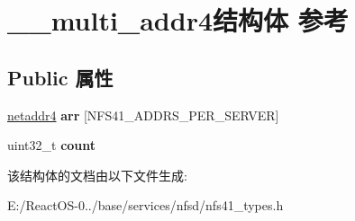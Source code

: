 \hypertarget{struct____multi__addr4}{}\section{\+\_\+\+\_\+multi\+\_\+addr4结构体 参考}
\label{struct____multi__addr4}
\subsection*{Public 属性}
\begin{DoxyCompactItemize}
\item 
\mbox{\label{struct____multi__addr4_a221fd0b575bc89c15b9d958476b78b92}} 
\hyperlink{struct____netaddr4}{netaddr4} {\bfseries arr} \mbox{[}N\+F\+S41\+\_\+\+A\+D\+D\+R\+S\+\_\+\+P\+E\+R\+\_\+\+S\+E\+R\+V\+ER\mbox{]}
\item 
\mbox{\label{struct____multi__addr4_a60ce39783a6219d2c2921216ca356884}} 
uint32\+\_\+t {\bfseries count}
\end{DoxyCompactItemize}


该结构体的文档由以下文件生成\+:\begin{DoxyCompactItemize}
\item 
E\+:/\+React\+O\+S-\/0../base/services/nfsd/nfs41\+\_\+types.\+h\end{DoxyCompactItemize}
